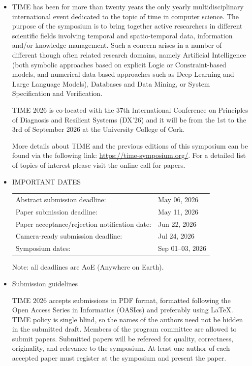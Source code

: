 \documentclass[prodmode,acmtecs]{acmsmall} %
\begin{document}
\begin{itemize}\item  TIME has been for more than twenty years the only yearly multidisciplinary international event dedicated to the topic of time in computer science. The purpose of the symposium is to bring together active researchers in different scientific fields involving temporal and spatio-temporal data, information and/or knowledge management. Such a concern arises in a number of different though often related research domains, namely Artificial Intelligence (both symbolic approaches based on explicit Logic or Constraint-based models, and numerical data-based approaches such as Deep Learning and Large Language Models), Databases and Data Mining, or System Specification and Verification. 
 
  TIME 2026 is co-located with the 37th International Conference on Principles of Diagnosis and Resilient Systems (DX’26) and it will be from the 1st to the 3rd of September 2026 at the University College of Cork. 
 
  More details about TIME and the previous editions of this symposium can be found via the following link: \href{https://time-symposium.org/}{https://time-symposium.org/}. For a detailed list of topics of interest please visit the online call for papers.  
 
\item  IMPORTANT DATES  
 
\begin{tabulary}{\linewidth}{LL}Abstract submission deadline:  & May 06, 2026 \\
Paper submission deadline:  & May 11, 2026 \\
Paper acceptance/rejection notification date:  & Jun 22, 2026 \\
Camera-ready submission deadline:  & Jul 24, 2026 \\
Symposium dates:  & Sep 01–03, 2026 \\
\end{tabulary}
 
  Note: all deadlines are AoE (Anywhere on Earth). 
 
\item  Submission guidelines 
 
  TIME 2026 accepts submissions in PDF format, formatted following the Open Access Series in Informatics (OASIcs) and preferably using LaTeX. TIME policy is single blind, so the names of the authors need not be hidden in the submitted draft. Members of the program committee are allowed to submit papers. Submitted papers will be refereed for quality, correctness, originality, and relevance to the symposium. At least one author of each accepted paper must register at the symposium and present the paper. 
 

\end{itemize}
\end{document}
